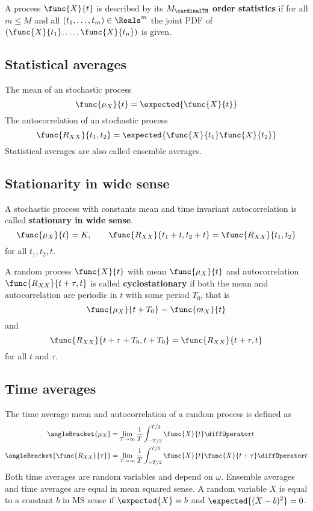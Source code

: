 \begin{definition}
    A process \(\func{X}{t}\) is described by its \(M_{\cardinalTH}\) \textbf{order statistics} if for all \(m \leq M\) and all \((t_1, \dots, t_m) \in \Reals^m\) the joint PDF of \((\func{X}{t_1} , \dots , \func{X}{t_n})\) is given.
\end{definition}
\subsection{Statistical averages}
The mean of an stochastic process 
\begin{equation*}
    \func{\mu_X}{t} = \expected{\func{X}{t}}
\end{equation*}
The autocorrelation of an stochastic process
\begin{equation*}
    \func{R_{XX}}{t_1,t_2} = \expected{\func{X}{t_1} \func{X}{t_2}}
\end{equation*}
Statistical averages are also called ensemble averages.
\subsection{Stationarity in wide sense}
A stochastic process with constants mean and time invariant autocorrelation is called \textbf{stationary in wide sense}.
\begin{equation*}
    \func{\mu_X}{t} = K, \qquad \func{R_{XX}}{t_1 + t, t_2 + t}=  \func{R_{XX}}{t_1, t_2}
\end{equation*}
for all \(t_1,t_2,t\).
\begin{definition}
    A random process \(\func{X}{t}\) with mean \(\func{\mu_X}{t}\) and autocorrelation \(\func{R_{XX}}{t + \tau,t}\) is called \textbf{cyclostationary} if both the mean and autocorrelation are periodic in \(t\) with some period \(T_0\), that is 
    \begin{equation*}
        \func{\mu_X}{t + T_0} = \func{m_X}{t}
    \end{equation*}
    and 
    \begin{equation*}
        \func{R_{XX}}{t + \tau + T_0, t + T_0} = \func{R_{XX}}{t + \tau, t}
    \end{equation*}
    for all \(t\) and \(\tau\). 
\end{definition}
\subsection{Time averages}
The time average mean and autocorrelation of a random process is defined as 
\begin{align*}
    \angleBracket{\mu_X} &= \lim_{T \to \infty} \dfrac{1}{T} \int_{-T/2}^{T/2} \func{X}{t} \diffOperator t\\
    \angleBracket{\func{R_{XX}}{\tau}} &= \lim_{T \to \infty} \dfrac{1}{T} \int_{-T/2}^{T/2} \func{X}{t} \func{X}{t + \tau} \diffOperator t\\
\end{align*}
Both time averages are random variables and depend on \(\omega\).
Ensemble averages and time averages are equal in mean squared sense. A random variable \(X\) is equal to a constant \(b\) in MS sense if \(\expected{X} = b\) and \(\expected{(X - b)^2} = 0\).
